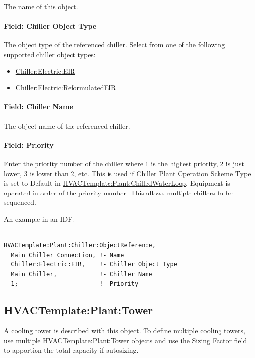 The name of this object.

\paragraph{Field: Chiller Object Type}

The object type of the referenced chiller. Select from one of the following supported chiller object types:

\begin{itemize}
\item
  \hyperref[chillerelectriceir]{Chiller:Electric:EIR}
\item
  \hyperref[chillerelectricreformulatedeir]{Chiller:Electric:ReformulatedEIR}
\end{itemize}

\paragraph{Field: Chiller Name}\label{field-chiller-name}

The object name of the referenced chiller.

\paragraph{Field: Priority}\label{field-priority-1}

Enter the priority number of the chiller where 1 is the highest priority, 2 is just lower, 3 is lower than 2, etc. This is used if Chiller Plant Operation Scheme Type is set to Default in \hyperref[hvactemplateplantchilledwaterloop]{HVACTemplate:Plant:ChilledWaterLoop}. Equipment is operated in order of the priority number. This allows multiple chillers to be sequenced.

An example in an IDF:

\begin{lstlisting}

HVACTemplate:Plant:Chiller:ObjectReference,
  Main Chiller Connection, !- Name
  Chiller:Electric:EIR,    !- Chiller Object Type
  Main Chiller,            !- Chiller Name
  1;                       !- Priority
\end{lstlisting}

\subsection{HVACTemplate:Plant:Tower}\label{hvactemplateplanttower}

A cooling tower is described with this object. To define multiple cooling towers, use multiple HVACTemplate:Plant:Tower objects and use the Sizing Factor field to apportion the total capacity if autosizing.

